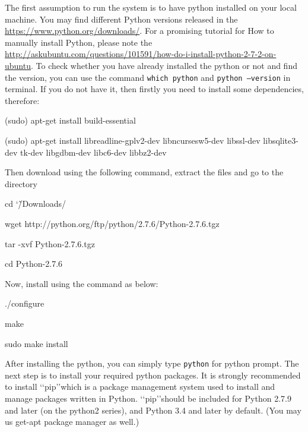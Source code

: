 \documentclass[[12pt,DIV14,BCOR12mm,a4paper,footexclude,headinclude,halfparskip-,twoside,openright,cleardoubleempty,idxtotoc,bibtotoc]{article}
\begin{document}
The first assumption to run the system is to have python installed on your local machine. You may find different Python versions released in the \url{https://www.python.org/downloads/}. For a promising tutorial for How to manually install Python, please note the \url{http://askubuntu.com/questions/101591/how-do-i-install-python-2-7-2-on-ubuntu}. To check whether you have already installed the python or not and find the version, you can use the command \texttt{which python} and \texttt{python --version} in terminal. If you do not have it, then firstly you need to install some dependencies, therefore:

\begin{framed}
 
(sudo) apt-get install build-essential

(sudo) apt-get install libreadline-gplv2-dev libncursesw5-dev libssl-dev libsqlite3-dev tk-dev libgdbm-dev libc6-dev libbz2-dev

\end{framed}


Then download using the following command, extract the files and go to the directory

\begin{framed}

cd \char`\~/Downloads/

wget http://python.org/ftp/python/2.7.6/Python-2.7.6.tgz

tar -xvf Python-2.7.6.tgz

cd Python-2.7.6

\end{framed}

Now, install using the command as below:

\begin{framed}

./configure

make

sudo make install

\end{framed}


After installing the python, you can simply type \texttt{python} for python prompt. The next step is to install your required python packages. It is strongly recommended to install \lq\lq pip\rq\rq which is a package management system used to install and manage packages written in Python. \lq\lq pip\rq\rq should be included for Python 2.7.9 and later (on the python2 series), and Python 3.4 and later by default. (You may us get-apt package manager as well.)
\end{document}
